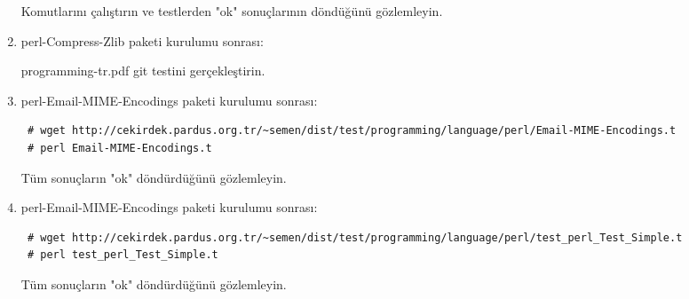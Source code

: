 \documentclass[a4paper,10pt]{article}
\begin{document}
\begin{enumerate}
Komutlarını çalıştırın ve testlerden "ok" sonuçlarının döndüğünü gözlemleyin.
\item perl-Compress-Zlib paketi kurulumu sonrası:

programming-tr.pdf git testini gerçekleştirin.

\item perl-Email-MIME-Encodings paketi kurulumu sonrası:
\begin{verbatim}
 # wget http://cekirdek.pardus.org.tr/~semen/dist/test/programming/language/perl/Email-MIME-Encodings.t
 # perl Email-MIME-Encodings.t
\end{verbatim}

Tüm sonuçların "ok" döndürdüğünü gözlemleyin. 

\item perl-Email-MIME-Encodings paketi kurulumu sonrası:
\begin{verbatim}
 # wget http://cekirdek.pardus.org.tr/~semen/dist/test/programming/language/perl/test_perl_Test_Simple.t
 # perl test_perl_Test_Simple.t
\end{verbatim}

Tüm sonuçların "ok" döndürdüğünü gözlemleyin. 


\end{enumerate}
\end{document}
